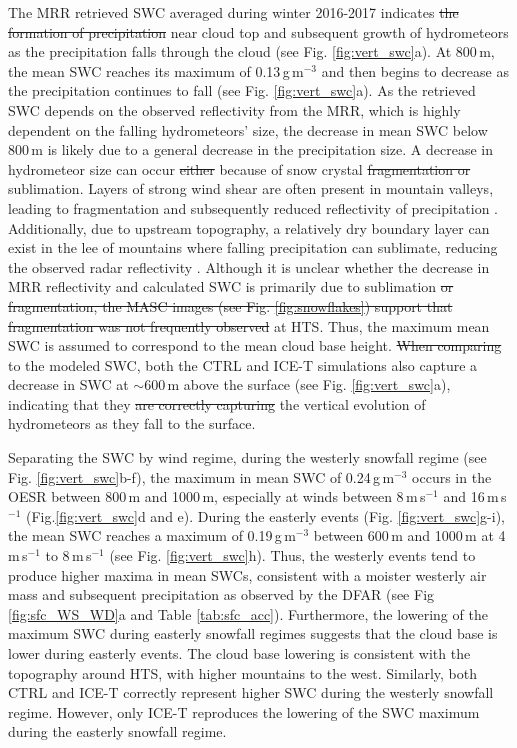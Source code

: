 \documentclass{ametsocV5}
\providecommand{\DIFadd}[1]{{\protect\color{blue}\uwave{#1}}} %
\providecommand{\DIFdel}[1]{{\protect\color{red}\sout{#1}}}                      %
\providecommand{\DIFaddbegin}{} %
\providecommand{\DIFaddend}{} %
\providecommand{\DIFdelbegin}{} %
\providecommand{\DIFdelend}{} %
\newcommand{\DIFscaledelfig}{0.5}
\newlength{\DIFdelgraphicswidth} %
\newlength{\DIFdelgraphicsheight} %
\newcommand{\DIFaddincludegraphics}[2][]{{\color{blue}\fbox{\DIFOincludegraphics[#1]{#2}}}} %
\newcommand{\DIFdelincludegraphics}[2][]{%
\sbox{\DIFdelgraphicsbox}{\DIFOincludegraphics[#1]{#2}}%
\settoboxwidth{\DIFdelgraphicswidth}{\DIFdelgraphicsbox} %
\settoboxtotalheight{\DIFdelgraphicsheight}{\DIFdelgraphicsbox} %
\scalebox{\DIFscaledelfig}{%
\parbox[b]{\DIFdelgraphicswidth}{\usebox{\DIFdelgraphicsbox}\\[-\baselineskip] \rule{\DIFdelgraphicswidth}{0em}}\llap{\resizebox{\DIFdelgraphicswidth}{\DIFdelgraphicsheight}{%
\setlength{\unitlength}{\DIFdelgraphicswidth}%
\begin{picture}(1,1)%
\thicklines\linethickness{2pt} %
{\color[rgb]{1,0,0}\put(0,0){\framebox(1,1){}}}%
{\color[rgb]{1,0,0}\put(0,0){\line( 1,1){1}}}%
{\color[rgb]{1,0,0}\put(0,1){\line(1,-1){1}}}%
\end{picture}%
}\hspace*{3pt}}} %
} %
\DeclareRobustCommand{\DIFaddbegin}{\DIFOaddbegin \let\includegraphics\DIFaddincludegraphics} %
\DeclareRobustCommand{\DIFaddend}{\DIFOaddend \let\includegraphics\DIFOincludegraphics} %
\DeclareRobustCommand{\DIFdelbegin}{\DIFOdelbegin \let\includegraphics\DIFdelincludegraphics} %
\DeclareRobustCommand{\DIFdelend}{\DIFOaddend \let\includegraphics\DIFOincludegraphics} %
\begin{document}
		The MRR retrieved SWC averaged during winter 2016-2017 indicates \DIFdelbegin \DIFdel{the formation of precipitation }\DIFdelend \DIFaddbegin \DIFadd{precipitation formation }\DIFaddend near cloud top and subsequent growth of hydrometeors as the precipitation falls through the cloud (see Fig. \ref{fig:vert_swc}a). At 800\,m, the mean SWC reaches its maximum of 0.13\,g\,m$^{-3}$ and then begins to decrease as the precipitation continues to fall (see Fig. \ref{fig:vert_swc}a). 
		As the retrieved SWC depends on the observed reflectivity from the MRR, which is highly dependent on the falling hydrometeors' size, the decrease in mean SWC below 800\,m is likely due to a general decrease in the precipitation size. A decrease in hydrometeor size can occur \DIFdelbegin \DIFdel{either }\DIFdelend because of snow crystal \DIFdelbegin \DIFdel{fragmentation or }\DIFdelend sublimation. Layers of strong wind shear are often present in mountain valleys, leading to fragmentation and subsequently reduced reflectivity of precipitation \citep{ramelli_influence_2020}. Additionally, due to upstream topography, a relatively dry boundary layer can exist in the lee of mountains where falling precipitation can sublimate, reducing the observed radar reflectivity \citep[e.g.,][]{ramelli_microphysical_2020}. Although it is unclear whether the decrease in MRR reflectivity and calculated SWC is primarily due to sublimation \DIFdelbegin \DIFdel{or fragmentation, the MASC images (see Fig. \ref{fig:snowflakes}) support that fragmentation was not frequently observed }\DIFdelend at HTS. 
		Thus, the maximum mean SWC is assumed to correspond to the mean cloud base height. \DIFdelbegin \DIFdel{When comparing }\DIFdelend \DIFaddbegin \DIFadd{Compared }\DIFaddend to the modeled SWC, both the CTRL and ICE-T simulations also capture a decrease in SWC at $\sim$600\,m above the surface (see Fig. \ref{fig:vert_swc}a), indicating that they \DIFdelbegin \DIFdel{are correctly capturing }\DIFdelend \DIFaddbegin \DIFadd{correctly account for }\DIFaddend the vertical evolution of hydrometeors as they fall to the surface.

		Separating the SWC by wind regime, during the westerly snowfall regime (see Fig. \ref{fig:vert_swc}b-f), the maximum in mean SWC of 0.24\,g\,m$^{-3}$ occurs in the OESR between 800\,m and 1000\,m, especially at winds between 8\,m\,s$^{-1}$ and 16\,m\,s$^{-1}$ (Fig.\ref{fig:vert_swc}d and e). During the easterly events (Fig. \ref{fig:vert_swc}g-i), the mean SWC reaches a maximum of 0.19\,g\,m$^{-3}$ between 600\,m and 1000\,m at 4\,m\,s$^{-1}$ to 8\,m\,s$^{-1}$ (see Fig. \ref{fig:vert_swc}h). Thus, the westerly events tend to produce higher maxima in mean SWCs, consistent with a moister westerly air mass and subsequent precipitation as observed by the DFAR (see Fig \ref{fig:sfc_WS_WD}a and Table \ref{tab:sfc_acc}). Furthermore, the lowering of the maximum SWC during easterly snowfall regimes suggests that the cloud base is lower during easterly events. The cloud base lowering is consistent with the topography around HTS, with higher mountains to the west. Similarly, both CTRL and ICE-T correctly represent higher SWC during the westerly snowfall regime. However, only ICE-T reproduces the lowering of the SWC maximum during the easterly snowfall regime. 
\end{document}
